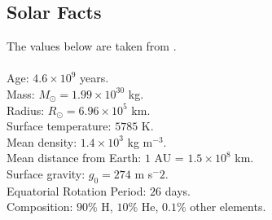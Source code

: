 \documentclass[12pt,a4paper,twoside]{article}
\begin{document}
\subsection{Solar Facts}
The values below are taken from \citep{priest2014magnetohydrodynamics}.  \\ \\
Age: $4.6 \times 10^9$ years. \\
Mass: $M_{\odot}= 1.99 \times 10^{30}$ kg. \\
Radius: $R_{\odot} = 6.96 \times 10^5$ km. \\
Surface temperature: $5785$ K. \\
Mean density: $1.4 \times 10^3$ kg m$^{-3}$. \\
Mean distance from Earth: $1$ AU = $1.5 \times 10^8$ km. \\
Surface gravity: $g_{0}=274$ m s$^-2$. \\
Equatorial Rotation Period: $26$ days. \\
Composition: $90 \%$ H, $10 \%$ He, $0.1 \%$ other elements.    
\end{document}
